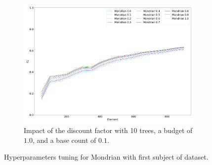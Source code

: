 \begin{figure}
\begin{subfigure}[b]{0.49\textwidth}
		 \centering
		 \includegraphics[width=\textwidth]{figures/calibration_mondrian_discount.png}
		 \caption{Impact of the discount factor with 10 trees, a budget of $1.0$, and a base count of $0.1$.}
		 \label{fig:mondrian-discount}
	 \end{subfigure}
		\caption{Hyperparameters tuning for Mondrian with first subject of \banosdataset dataset.}
		\label{fig:mondrian-tuning}
\end{figure}


